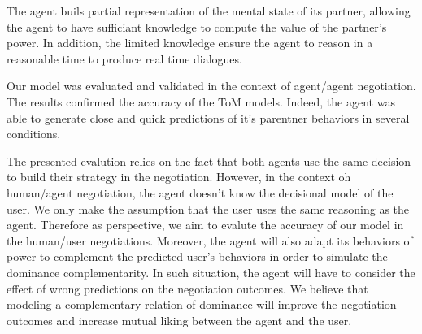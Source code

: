 \documentclass[sigconf]{aamas}  %
\begin{document}
		The agent buils partial representation of the mental state of its partner, allowing the agent to have sufficiant knowledge to compute the value of the partner's power. In addition, the limited knowledge ensure the agent to reason in a reasonable time to produce real time dialogues.
		
		Our model was evaluated and validated in the context of agent/agent negotiation. The results confirmed the accuracy of the ToM models. Indeed, the agent was able to generate close and quick predictions of it's parentner behaviors in several conditions.
		
		The presented evalution relies on the fact that both agents use the same decision to build their strategy in  the negotiation. However, in the context oh human/agent negotiation, the agent doesn't know the decisional model of the user. We only make the assumption that the user uses the same reasoning as the agent.
		 Therefore as perspective, we aim to evalute the accuracy of our model in the human/user negotiations. Moreover, the agent will also adapt its behaviors of power to complement the predicted user's behaviors in order to simulate the dominance complementarity. In such situation, the agent will have to consider the effect of wrong predictions on the negotiation outcomes. We believe that modeling a complementary relation of dominance will improve the negotiation outcomes and increase mutual liking between the agent and the user.
		
		
	
	
\end{document}

